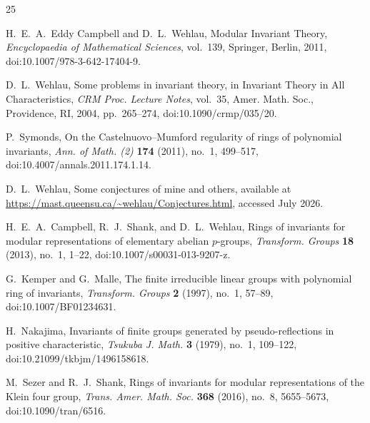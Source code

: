 \documentclass[11pt]{article}
\theoremstyle{definition}
\begin{document}
\begin{thebibliography}{25}

 H.~E.~A.~Eddy Campbell and D.~L.~Wehlau, Modular Invariant Theory, \emph{Encyclopaedia of Mathematical Sciences}, vol.~139, Springer, Berlin, 2011, doi:10.1007/978-3-642-17404-9.

 D.~L.~Wehlau, Some problems in invariant theory, in Invariant Theory in All Characteristics, \emph{CRM Proc. Lecture Notes}, vol.~35, Amer. Math. Soc., Providence, RI, 2004, pp.~265--274, doi:10.1090/crmp/035/20.

 P.~Symonds, On the Castelnuovo--Mumford regularity of rings of polynomial invariants, \emph{Ann. of Math. (2)} \textbf{174} (2011), no.~1, 499--517, doi:10.4007/annals.2011.174.1.14.

 D.~L.~Wehlau, Some conjectures of mine and others, available at \url{https://mast.queensu.ca/~wehlau/Conjectures.html}, accessed July 2026.

 H.~E.~A.~Campbell, R.~J.~Shank, and D.~L.~Wehlau, Rings of invariants for modular representations of elementary abelian $p$-groups, \emph{Transform. Groups} \textbf{18} (2013), no.~1, 1--22, doi:10.1007/s00031-013-9207-z.

 G.~Kemper and G.~Malle, The finite irreducible linear groups with polynomial ring of invariants, \emph{Transform. Groups} \textbf{2} (1997), no.~1, 57--89, doi:10.1007/BF01234631.

 H.~Nakajima, Invariants of finite groups generated by pseudo-reflections in positive characteristic, \emph{Tsukuba J. Math.} \textbf{3} (1979), no.~1, 109--122, doi:10.21099/tkbjm/1496158618.

 M.~Sezer and R.~J.~Shank, Rings of invariants for modular representations of the Klein four group, \emph{Trans. Amer. Math. Soc.} \textbf{368} (2016), no.~8, 5655--5673, doi:10.1090/tran/6516.
\end{thebibliography}
\end{document}
